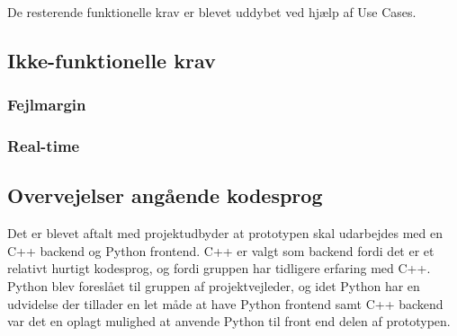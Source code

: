 \documentclass[analyse.tex]{subfiles}
\begin{document}
De resterende funktionelle krav er blevet uddybet ved hjælp af Use Cases.


\subsection{Ikke-funktionelle krav}




\subsubsection{Fejlmargin}



\subsubsection{Real-time}
  


\subsection{Overvejelser angående kodesprog}
Det er blevet aftalt med projektudbyder at prototypen skal udarbejdes med en C++ backend og Python frontend.
C++ er valgt som backend fordi det er et relativt hurtigt kodesprog, og fordi gruppen har tidligere erfaring
med C++. Python blev foreslået til gruppen af projektvejleder, og idet Python har en udvidelse der tillader
en let måde at have Python frontend samt C++ backend var det en oplagt mulighed at anvende Python til front
end delen af prototypen.
\end{document}
